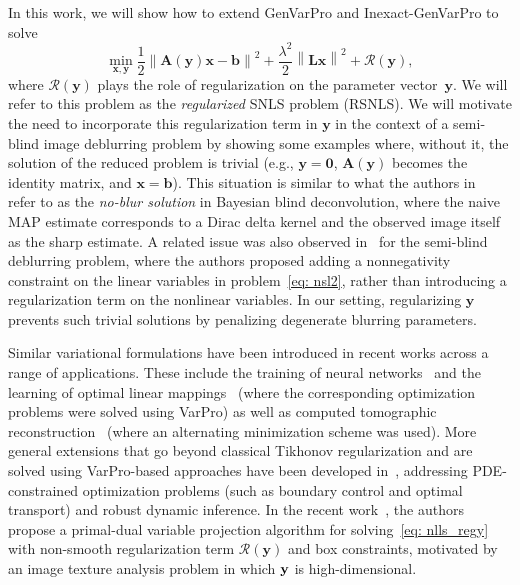 \documentclass[onefignum,onetabnum]{siamart171218}
\newcommand{\by}{{\bf y}}
\begin{document}
In this work, we will show how to extend GenVarPro and Inexact-GenVarPro to solve
\begin{equation}\label{eq: nlls_regy}
\min_{\mathbf{x}, \mathbf{y}} \frac{1}{2}\left\|\mathbf{A}(\mathbf{y})\mathbf{x} - \mathbf{b} \right\|^2 + \frac{\lambda^2}{2} \left\|\mathbf{L} \mathbf{x}\right\|^2 + \mathcal{R}(\mathbf{y}),
\end{equation}
where $\mathcal{R}(\mathbf{y})$ plays the role of regularization on the parameter vector~$\mathbf{y}$. We will refer to this problem as the \emph{regularized} SNLS problem (RSNLS). We will motivate the need to incorporate this regularization term in $\mathbf{y}$ in the context of a semi-blind image deblurring problem by showing some examples where, without it, the solution of the reduced problem is trivial (e.g., $\mathbf{y}=\boldsymbol{0}$, $\mathbf{A}(\mathbf{y})$ becomes the identity matrix, and $\mathbf{x}=\mathbf{b}$). 
This situation is similar to what the authors in~\cite{levin2009understanding} refer to as the \emph{no-blur solution} in Bayesian blind deconvolution, where the naive MAP estimate corresponds to a Dirac delta kernel and the observed image itself as the sharp estimate. A related issue was also observed in~\cite{cornelio2014constrained} for the semi-blind deblurring problem, where the authors proposed adding a nonnegativity constraint on the linear variables in problem~\eqref{eq: nsl2}, rather than introducing a regularization term on the nonlinear variables. 
In our setting, regularizing $\mathbf{y}$ prevents such trivial solutions by penalizing degenerate blurring parameters.

Similar variational formulations have been introduced in recent works across a range of applications. These include the training of neural networks~\cite{newman2021train} and the learning of optimal linear mappings~\cite{newman2025optimal} (where the corresponding optimization problems were solved using VarPro) as well as computed tomographic reconstruction~\cite{uribe2022hybrid} (where an alternating minimization scheme was used). More general extensions that go beyond classical Tikhonov regularization and are solved using VarPro-based approaches have been developed in~\cite{aravkin2017efficient, van2021variable}, addressing PDE-constrained optimization problems (such as boundary control and optimal transport) and robust dynamic inference. In the recent work~\cite{marmin2025varprox}, the authors propose a primal-dual variable projection algorithm for solving~\eqref{eq: nlls_regy} with non-smooth regularization term $\mathcal{R}(\mathbf{y})$ and box constraints, motivated by an image texture analysis problem in which $\by$ is high-dimensional.
\end{document}
